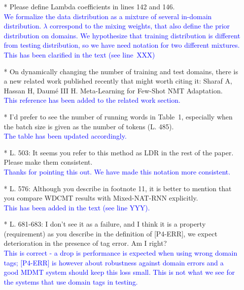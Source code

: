 \documentclass[12pt,times,a4paper,twoside]{article}
\newcommand{\fyTodo}[1]{\Todo[FY:]{\textcolor{orange}{#1}}}
\theoremstyle{definition}
\begin{document}
\begin{itemize}
\item[*] Please define Lambda coefficients in lines 142 and 146.
\\
\textcolor{blue}{We formalize the data distribution as a mixture of several in-domain distribution. $\lambda$ correspond to the mixing weights, that also define the prior distribution on domains. We hypothesize that training distribution is different from testing distribution, so we have need notation for two different mixtures. This has been clarified in the text (see line~XXX) \fyTodo{add lines}}
\\
\item[*] On dynamically changing the number of training and test domains, there is a new related work published recently that might worth citing it: Sharaf A, Hassan H, Daumé III H. Meta-Learning for Few-Shot NMT Adaptation.
\\
\textcolor{blue}{This reference has been added to the related work section.}\fyTodo{Add citation}
\\
\item[*] I’d prefer to see the number of running words in Table~1, especially when the batch size is given as the number of tokens (L. 485).
  \\
  \textcolor{blue}{The table has been updated accordingly.}\fyTodo{to report number of tokens of the datasets}
\\
\item[*] L. 503: It seems you refer to this method as LDR in the rest of the paper. Please make them consistent.
\\
\textcolor{blue}{Thanks for pointing this out. We have made this notation more consistent.}
\\
\item[*] L. 576: Although you describe in footnote 11, it is better to mention that you compare WDCMT results with Mixed-NAT-RNN explicitly.
\\
\textcolor{blue}{This has been added in the text (see line YYY).}\fyTodo{to explicitly compare WDCNMT with Mixed-NAT-RNN. This is in the legend - change presentations ?}
\\
\item[*] L. 681-683: I don’t see it as a failure, and I think it is a property (requirement) as you describe in the definition of [P4-ERR], we expect deterioration in the presence of tag error. Am I right?
\\
\textcolor{blue}{This is correct - a drop is performance is expected when using wrong domain tags; [P4-ERR] is however about robustness against domain errors and a good MDMT system should keep this loss small. This is not what we see for the systems that use domain tags in testing.}


\end{itemize}
\end{document}
